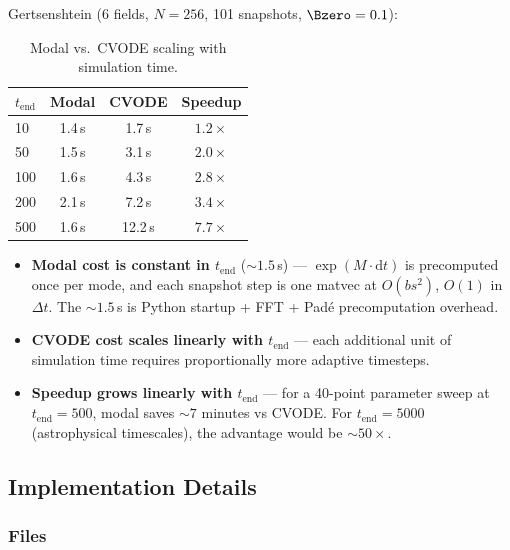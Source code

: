Gertsenshtein (6 fields, $N=256$, 101 snapshots, $\Bzero=0.1$):

\begin{table}[htbp]
\centering
\caption{Modal vs.\ CVODE scaling with simulation time.}
\label{tab:modal-scaling-tend}
\begin{tabular}{@{}lccc@{}}
\toprule
$t_\text{end}$ & Modal & CVODE & Speedup \\
\midrule
10  & 1.4\,s & 1.7\,s  & $\mathbf{1.2\times}$ \\
50  & 1.5\,s & 3.1\,s  & $\mathbf{2.0\times}$ \\
100 & 1.6\,s & 4.3\,s  & $\mathbf{2.8\times}$ \\
200 & 2.1\,s & 7.2\,s  & $\mathbf{3.4\times}$ \\
500 & 1.6\,s & 12.2\,s & $\mathbf{7.7\times}$ \\
\bottomrule
\end{tabular}
\end{table}

\begin{itemize}
  \item \textbf{Modal cost is constant in $t_\text{end}$} (${\sim}1.5$\,s) --- $\exp(M \cdot \mathrm{d}t)$ is precomputed once per mode, and each snapshot step is one matvec at $O(bs^2)$, $O(1)$ in $\Delta t$. The ${\sim}1.5$\,s is Python startup + FFT + Pad\'{e} precomputation overhead.
  \item \textbf{CVODE cost scales linearly with $t_\text{end}$} --- each additional unit of simulation time requires proportionally more adaptive timesteps.
  \item \textbf{Speedup grows linearly with $t_\text{end}$} --- for a 40-point parameter sweep at $t_\text{end}=500$, modal saves ${\sim}7$ minutes vs CVODE. For $t_\text{end}=5000$ (astrophysical timescales), the advantage would be ${\sim}50\times$.
\end{itemize}

\subsection{Implementation Details}
\label{sec:modal-implementation}

\subsubsection{Files}
\label{sec:modal-files}

